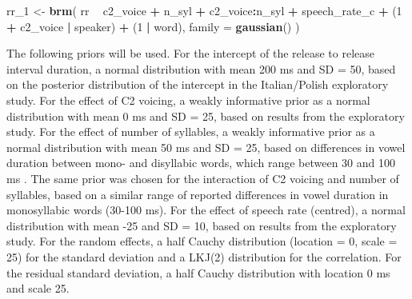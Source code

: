 \documentclass[11pt,]{article}
\newenvironment{Shaded}{\begin{snugshade}}{\end{snugshade}}
\newcommand{\DataTypeTok}[1]{\textcolor[rgb]{0.13,0.29,0.53}{#1}}
\newcommand{\DecValTok}[1]{\textcolor[rgb]{0.00,0.00,0.81}{#1}}
\newcommand{\KeywordTok}[1]{\textcolor[rgb]{0.13,0.29,0.53}{\textbf{#1}}}
\newcommand{\NormalTok}[1]{#1}
\newcommand{\OperatorTok}[1]{\textcolor[rgb]{0.81,0.36,0.00}{\textbf{#1}}}
\newcommand{\StringTok}[1]{\textcolor[rgb]{0.31,0.60,0.02}{#1}}
\begin{document}
\begin{Shaded}
\begin{Highlighting}[]
\NormalTok{rr_}\DecValTok{1}\NormalTok{ <-}\StringTok{ }\KeywordTok{brm}\NormalTok{(}
\NormalTok{  rr }\OperatorTok{~}
\StringTok{    }\NormalTok{c2_voice }\OperatorTok{+}
\StringTok{    }\NormalTok{n_syl }\OperatorTok{+}
\StringTok{    }\NormalTok{c2_voice}\OperatorTok{:}\NormalTok{n_syl }\OperatorTok{+}
\StringTok{    }\NormalTok{speech_rate_c }\OperatorTok{+}
\StringTok{    }\NormalTok{(}\DecValTok{1} \OperatorTok{+}\StringTok{ }\NormalTok{c2_voice }\OperatorTok{|}\StringTok{ }\NormalTok{speaker) }\OperatorTok{+}
\StringTok{    }\NormalTok{(}\DecValTok{1} \OperatorTok{|}\StringTok{ }\NormalTok{word),}
  \DataTypeTok{family =} \KeywordTok{gaussian}\NormalTok{()}
\NormalTok{)}
\end{Highlighting}
\end{Shaded}

The following priors will be used. For the intercept of the release to
release interval duration, a normal distribution with mean 200 ms and SD
= 50, based on the posterior distribution of the intercept in the
Italian/Polish exploratory study. For the effect of C2 voicing, a weakly
informative prior as a normal distribution with mean 0 ms and SD = 25,
based on results from the exploratory study. For the effect of number of
syllables, a weakly informative prior as a normal distribution with mean
50 ms and SD = 25, based on differences in vowel duration between mono-
and disyllabic words, which range between 30 and 100 ms
\citep{sharf1962, klatt1973}. The same prior was chosen for the
interaction of C2 voicing and number of syllables, based on a similar
range of reported differences in vowel duration in monosyllabic words
(30-100 ms). For the effect of speech rate (centred), a normal
distribution with mean -25 and SD = 10, based on results from the
exploratory study. For the random effects, a half Cauchy distribution
(location = 0, scale = 25) for the standard deviation and a LKJ(2)
distribution for the correlation. For the residual standard deviation, a
half Cauchy distribution with location 0 ms and scale 25.
\end{document}
